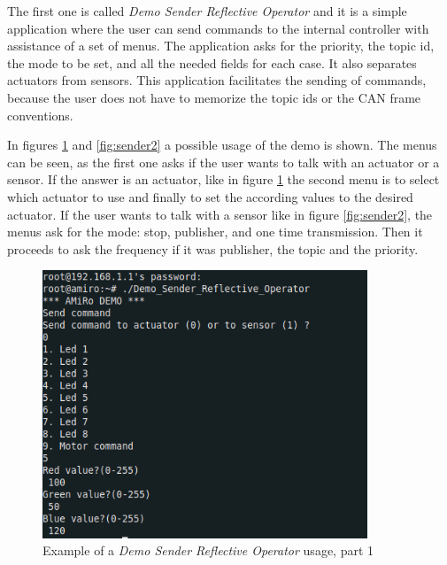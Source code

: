 \documentclass[12pt]{report}%
\begin{document}
The first one is called \textit{Demo Sender Reflective Operator} and it is a simple application where the user can send commands to the internal controller with assistance of a set of menus. The application asks for the priority, the topic id, the mode to be set, and all the needed fields for each case. It also separates actuators from sensors. This application facilitates the sending of commands, because the user does not have to memorize the topic ids or the CAN frame conventions.

In figures \ref{fig:sender1} and \ref{fig:sender2} a possible usage of the demo is shown. The menus can be seen, as the first one asks if the user wants to talk with an actuator or a sensor. If the answer is an actuator, like in figure \ref{fig:sender1} the second menu is to select which actuator to use and finally to set the according values to the desired actuator. If the user wants to talk with a sensor like in figure \ref{fig:sender2}, the menus ask for the mode: stop, publisher, and one time transmission. Then it proceeds to ask the frequency if it was publisher, the topic and the priority.

\begin{figure}[ht]
 \centering
 \includegraphics[width=\textwidth, height=8cm]{sender_example2}
		\caption{Example of a \textit{Demo Sender Reflective Operator} usage, part 1}
		\label{fig:sender1}
\end{figure}
\end{document}
